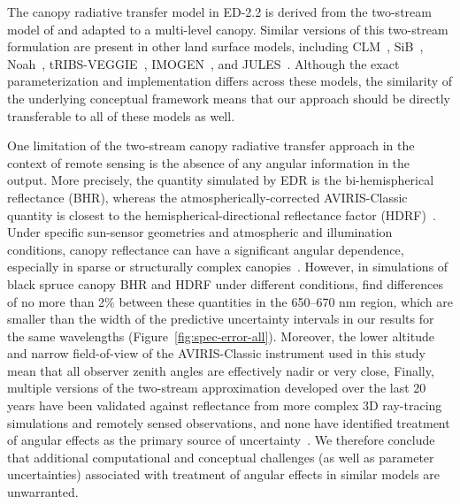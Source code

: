 The canopy radiative transfer model in ED-2.2 is derived from the two-stream model of \citet{sellers1985canopy} and adapted to a multi-level canopy.
Similar versions of this two-stream formulation are present in other land surface models, including CLM~\citep{clm45_note}, SiB~\citep{baker2008seasonal}, Noah~\citep{niu2011community}, tRIBS-VEGGIE~\citep{ivanov2008vegetationhydrology}, IMOGEN~\citep{huntingford2008quantifying}, and JULES~\citep{best_2011_joint}.
Although the exact parameterization and implementation differs across these models, the similarity of the underlying conceptual framework means that our approach should be directly transferable to all of these models as well.

One limitation of the two-stream canopy radiative transfer approach in the context of remote sensing is the absence of any angular information in the output.
More precisely, the quantity simulated by EDR is the bi-hemispherical reflectance (BHR), whereas the atmospherically-corrected AVIRIS-Classic quantity is closest to the hemispherical-directional reflectance factor (HDRF)~\citep[\emph{sensu}]{schaepman-strub2006reflectance}.
Under specific sun-sensor geometries and atmospheric and illumination conditions, canopy reflectance can have a significant angular dependence, especially in sparse or structurally complex canopies~\citep[e.g., ``hot spot effect'']{maignan2004bidirectional, schaepman-strub2006reflectance}.
However, in simulations of black spruce canopy BHR and HDRF under different conditions, \citet{schaepman-strub2006reflectance} find differences of no more than 2\% between these quantities in the 650--670 \unit{nm} region, which are smaller than the width of the predictive uncertainty intervals in our results for the same wavelengths (Figure~\ref{fig:spec-error-all}).
Moreover, the lower altitude and narrow field-of-view of the AVIRIS-Classic instrument used in this study mean that all observer zenith angles are effectively nadir or very close,
Finally, multiple versions of the two-stream approximation developed over the last 20 years have been validated against reflectance from more complex 3D ray-tracing simulations and remotely sensed observations, and none have identified treatment of angular effects as the primary source of uncertainty~\citep{hogan_2018_fast, yuan2017reexamination, pinty2004synergy}.
We therefore conclude that additional computational and conceptual challenges (as well as parameter uncertainties) associated with treatment of angular effects in similar models are unwarranted.

